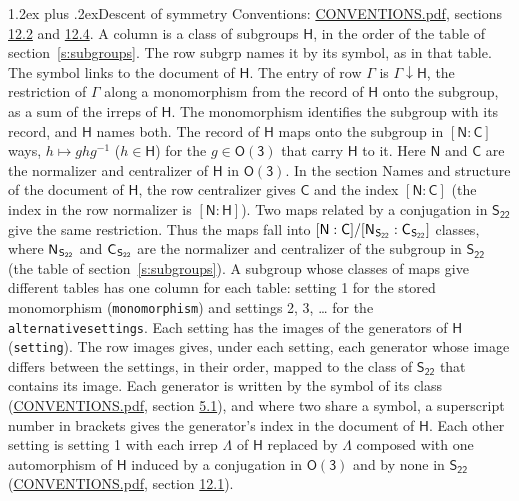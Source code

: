\documentclass[10pt,a4paper]{article}
\makeatletter
\renewcommand\section{\@startsection{section}{1}{\z@}{-3ex plus -1ex minus -.2ex}%
  {1.2ex plus .2ex}{\normalfont\large\sffamily\bfseries\color{parttitle}}}
\numberwithin{equation}{section}
\newcommand{\grp}[1]{\mathsf{#1}}
\newcommand{\grpindex}[2]{[#1 : #2]}
\newcommand{\restr}[2]{#1\!\downarrow#2}
\newcommand{\hairsp}{\mkern1mu}
\makeatother
\begin{document}
\section{Descent of symmetry}\label{s:subduction}
Conventions: \href{../../CONVENTIONS.pdf}{CONVENTIONS.pdf}, sections \href{../../CONVENTIONS.pdf\#conv.12.2}{12.2} and \href{../../CONVENTIONS.pdf\#conv.12.4}{12.4}.
A column is a class of subgroups $\grp{H}$, in the order of the table of section~\ref{s:subgroups}. The row subgrp names it by its symbol, as in that table. The symbol links to the document of $\grp{H}$. The entry of row $\Gamma$ is $\restr{\Gamma}{\grp{H}}$, the restriction of $\Gamma$ along a monomorphism from the record of $\grp{H}$ onto the subgroup, as a sum of the irreps of $\grp{H}$. The monomorphism identifies the subgroup with its record, and $\grp{H}$ names both. \label{n:group.normalizer.o3}\label{n:group.centralizer.o3}The record of $\grp{H}$ maps onto the subgroup in $\grpindex{\grp{N}}{\grp{C}}$ ways, $h \mapsto g h g^{-1}$ ($h \in \grp{H}$) for the $g \in \grp{O(3)}$ that carry $\grp{H}$ to it. Here $\grp{N}$ and $\grp{C}$ are the normalizer and centralizer of $\grp{H}$ in \href{O3.pdf}{$\grp{O(3)}$}. In the section Names and structure of the document of $\grp{H}$, the row centralizer gives $\grp{C}$ and the index $\grpindex{\grp{N}}{\grp{C}}$ (the index in the row normalizer is $\grpindex{\grp{N}}{\grp{H}}$). Two maps related by a conjugation in $\grp{S_{22}}$ give the same restriction. Thus the maps fall into $\grpindex{\grp{N}}{\grp{C}}/\grpindex{\grp{N}_{\hairsp \grp{S_{22}}}}{\grp{C}_{\hairsp \grp{S_{22}}}}$ classes, where $\grp{N}_{\hairsp \grp{S_{22}}}$ and $\grp{C}_{\hairsp \grp{S_{22}}}$ are the normalizer and centralizer of the subgroup in $\grp{S_{22}}$ (the table of section~\ref{s:subgroups}). \label{n:head.setting}A subgroup whose classes of maps give different tables has one column for each table: setting 1 for the stored monomorphism (\texttt{monomorphism}) and settings 2, 3, \dots{} for the \texttt{alternativesettings}. Each setting has the images of the generators of $\grp{H}$ (\texttt{setting}). \label{n:head.images}The row images gives, under each setting, each generator whose image differs between the settings, in their order, mapped to the class of $\grp{S_{22}}$ that contains its image. Each generator is written by the symbol of its class (\href{../../CONVENTIONS.pdf}{CONVENTIONS.pdf}, section \href{../../CONVENTIONS.pdf\#conv.5.1}{5.1}), and where two share a symbol, a superscript number in brackets gives the generator's index in the document of $\grp{H}$. \label{n:irrep.Delta}Each other setting is setting 1 with each irrep $\Lambda$ of $\grp{H}$ replaced by $\Lambda$ composed with one automorphism of $\grp{H}$ induced by a conjugation in \href{O3.pdf}{$\grp{O(3)}$} and by none in $\grp{S_{22}}$ (\href{../../CONVENTIONS.pdf}{CONVENTIONS.pdf}, section \href{../../CONVENTIONS.pdf\#conv.12.1}{12.1}).
\end{document}
